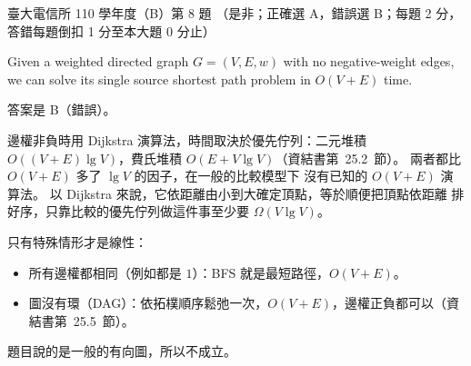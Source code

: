 \begin{pastexam}[label={px:ntu-110-comm-dsa-08}]{臺大電信所 110 學年度（B）第 8 題}
（是非；正確選 A，錯誤選 B；每題 2 分，答錯每題倒扣 1 分至本大題 0 分止）

Given a weighted directed graph $G=(V,E,w)$ with no negative-weight edges, we can solve its single source shortest path problem in $O(V+E)$ time.
\end{pastexam}

\begin{pastsoln}
答案是 B（錯誤）。

邊權非負時用 Dijkstra 演算法，時間取決於優先佇列：二元堆積 $O((V + E)\lg V)$，費氏堆積
$O(E + V\lg V)$（資結書第~25.2~節）。 兩者都比 $O(V + E)$ 多了 $\lg V$ 的因子，在一般的比較模型下
沒有已知的 $O(V + E)$ 演算法。 以 Dijkstra 來說，它依距離由小到大確定頂點，等於順便把頂點依距離
排好序，只靠比較的優先佇列做這件事至少要 $\Omega(V\lg V)$。

只有特殊情形才是線性：
\begin{itemize}
\item 所有邊權都相同（例如都是 $1$）：BFS 就是最短路徑，$O(V + E)$。
\item 圖沒有環（DAG）：依拓樸順序鬆弛一次，$O(V + E)$，邊權正負都可以（資結書第~25.5~節）。
\end{itemize}
題目說的是一般的有向圖，所以不成立。
\end{pastsoln}
